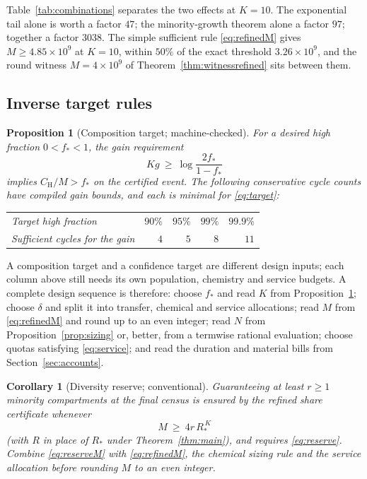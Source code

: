 \documentclass[11pt,a4paper]{article}
\theoremstyle{plain}
\newtheorem{proposition}[theorem]{Proposition}
\newtheorem{corollary}[theorem]{Corollary}
\theoremstyle{definition}
\theoremstyle{remark}
\newcommand{\hi}{\mathrm H}
\begin{document}
Table~\ref{tab:combinations} separates the two effects at $K=10$. The
exponential tail alone is worth a factor $47$; the minority-growth theorem
alone a factor $97$; together a factor $3038$. The simple sufficient rule
\eqref{eq:refinedM} gives $M\ge4.85\times10^{9}$ at $K=10$, within $50\%$ of
the exact threshold $3.26\times10^{9}$, and the round witness
$M=4\times10^{9}$ of Theorem~\ref{thm:witnessrefined} sits between them.

\subsection{Inverse target rules}\label{sec:targets}

\begin{proposition}[Composition target; machine-checked]\label{prop:target}
For a desired high fraction $0<f_*<1$, the gain requirement
\begin{equation}\label{eq:target}
Kg\ \ge\ \log\frac{2f_*}{1-f_*}
\end{equation}
implies $C_\hi/M>f_*$ on the certified event. The following conservative cycle
counts have compiled gain bounds, and each is minimal for \eqref{eq:target}:
\begin{center}
\begin{tabular}{@{}lrrrr@{}}\toprule
Target high fraction & $90\%$ & $95\%$ & $99\%$ & $99.9\%$\\
Sufficient cycles for the gain & $4$ & $5$ & $8$ & $11$\\\bottomrule
\end{tabular}
\end{center}
\end{proposition}

A composition target and a confidence target are different design inputs; each
column above still needs its own population, chemistry and service budgets. A
complete design sequence is therefore: choose $f_*$ and read $K$ from
Proposition~\ref{prop:target}; choose $\delta$ and split it into transfer,
chemical and service allocations; read $M$ from \eqref{eq:refinedM} and round up
to an even integer; read $N$ from Proposition~\ref{prop:sizing} or, better, from
a termwise rational evaluation; choose quotas satisfying \eqref{eq:service}; and
read the duration and material bills from Section~\ref{sec:accounts}.

\begin{corollary}[Diversity reserve; conventional]\label{cor:reserve}
Guaranteeing at least $r\ge1$ minority compartments at the final census is
ensured by the refined share certificate whenever
\begin{equation}\label{eq:reserveM}
M\ \ge\ 4r\,R_*^{\,K}
\end{equation}
(with $R$ in place of $R_*$ under Theorem~\ref{thm:main}), and requires
\eqref{eq:reserve}. Combine \eqref{eq:reserveM} with \eqref{eq:refinedM}, the
chemical sizing rule and the service allocation before rounding $M$ to an even
integer.
\end{corollary}
\end{document}
